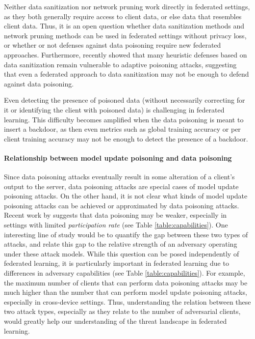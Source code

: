 \documentclass[11pt]{article}
\begin{document}
Neither data sanitization nor network pruning work directly in federated settings, as they both generally require access to client data, or else data that resembles client data. Thus, it is an open question whether data sanitization methods and network pruning methods can be used in federated settings without privacy loss, or whether or not defenses against data poisoning require new federated approaches. Furthermore, \citet{koh2018stronger} recently showed that many heuristic defenses based on data sanitization remain vulnerable to adaptive poisoning attacks, suggesting that even a federated approach to data sanitization may not be enough to defend against data poisoning.

Even detecting the presence of poisoned data (without necessarily correcting for it or identifying the client with poisoned data) is challenging in federated learning. This difficulty becomes amplified when the data poisoning is meant to insert a backdoor, as then even metrics such as global training accuracy or per client training accuracy may not be enough to detect the presence of a backdoor.

\paragraph{Relationship between model update poisoning and data poisoning}\label{p:model-data-poisoning}
Since data poisoning attacks eventually result in some alteration of a client's output to the server, data poisoning attacks are special cases of model update poisoning attacks. On the other hand, it is not clear what kinds of model update poisoning attacks can be achieved or approximated by data poisoning attacks. Recent work by \citet{pmlr-v97-bhagoji19a} suggests that data poisoning may be weaker, especially in settings with limited \emph{participation rate} (see Table \ref{table:capabilities}). One interesting line of study would be to quantify the gap between these two types of attacks, and relate this gap to the relative strength of an adversary operating under these attack models. While this question can be posed independently of federated learning, it is particularly important in federated learning due to differences in adversary capabilities (see Table \ref{table:capabilities}). For example, the maximum number of clients that can perform data poisoning attacks may be much higher than the number that can perform model update poisoning attacks, especially in cross-device settings. Thus, understanding the relation between these two attack types, especially as they relate to the number of adversarial clients, would greatly help our understanding of the threat landscape in federated learning.
\end{document}
